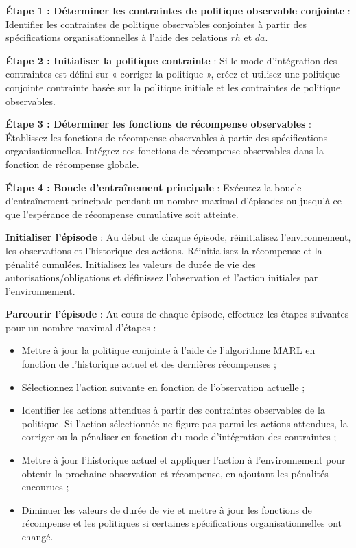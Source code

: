 \textbf{Étape 1 : Déterminer les contraintes de politique observable conjointe} :
Identifier les contraintes de politique observables conjointes à partir des spécifications organisationnelles à l'aide des relations $rh$ et $da$.

\textbf{Étape 2 : Initialiser la politique contrainte} :
Si le mode d'intégration des contraintes est défini sur « corriger la politique », créez et utilisez une politique conjointe contrainte basée sur la politique initiale et les contraintes de politique observables.

\textbf{Étape 3 : Déterminer les fonctions de récompense observables} :
Établissez les fonctions de récompense observables à partir des spécifications organisationnelles. Intégrez ces fonctions de récompense observables dans la fonction de récompense globale.

\textbf{Étape 4 : Boucle d'entraînement principale} :
Exécutez la boucle d'entraînement principale pendant un nombre maximal d'épisodes ou jusqu'à ce que l'espérance de récompense cumulative soit atteinte.

\textbf{Initialiser l'épisode} :
Au début de chaque épisode, réinitialisez l'environnement, les observations et l'historique des actions. Réinitialisez la récompense et la pénalité cumulées. Initialisez les valeurs de durée de vie des autorisations/obligations et définissez l'observation et l'action initiales par l'environnement.

\textbf{Parcourir l'épisode} :
Au cours de chaque épisode, effectuez les étapes suivantes pour un nombre maximal d'étapes :

\begin{itemize}
  \item Mettre à jour la politique conjointe à l'aide de l'algorithme MARL en fonction de l'historique actuel et des dernières récompenses ;
  \item Sélectionnez l'action suivante en fonction de l'observation actuelle ;
  \item Identifier les actions attendues à partir des contraintes observables de la politique. Si l'action sélectionnée ne figure pas parmi les actions attendues, la corriger ou la pénaliser en fonction du mode d'intégration des contraintes ;
  \item Mettre à jour l'historique actuel et appliquer l'action à l'environnement pour obtenir la prochaine observation et récompense, en ajoutant les pénalités encourues ;
  \item Diminuer les valeurs de durée de vie et mettre à jour les fonctions de récompense et les politiques si certaines spécifications organisationnelles ont changé.
\end{itemize}

